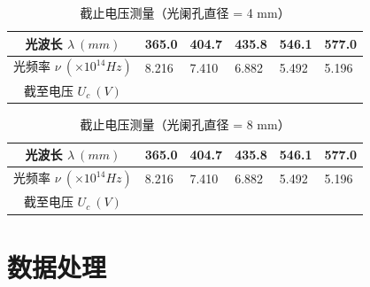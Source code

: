 \documentclass{ctexart}
\begin{document}
\begin{table}[!h]
    \centering
    \renewcommand{\arraystretch}{1.5} %
    \caption{截止电压测量（光阑孔直径 = 4 mm）}
    \begin{tabular}{|c|m{1.5cm}<{\centering}|m{1.5cm}<{\centering}|m{1.5cm}<{\centering}|m{1.5cm}<{\centering}|m{1.5cm}<{\centering}|}
        \hline
        光波长 $\lambda \ (mm)$ & 365.0 & 404.7 & 435.8 & 546.1 & 577.0 \\
        \hline
        光频率 $\nu \ (\times 10^{14} Hz)$ & 8.216 & 7.410 & 6.882 & 5.492 & 5.196 \\
        \hline
        截至电压 $ U_c \ (V)$ & & & & & \\
        \hline
    \end{tabular}
\end{table}

\begin{table}[!h]
    \centering
    \renewcommand{\arraystretch}{1.5} %
    \caption{截止电压测量（光阑孔直径 = 8 mm）}
    \begin{tabular}{|c|m{1.5cm}<{\centering}|m{1.5cm}<{\centering}|m{1.5cm}<{\centering}|m{1.5cm}<{\centering}|m{1.5cm}<{\centering}|}
        \hline
        光波长 $\lambda \ (mm)$ & 365.0 & 404.7 & 435.8 & 546.1 & 577.0 \\
        \hline
        光频率 $\nu \ (\times 10^{14} Hz)$ & 8.216 & 7.410 & 6.882 & 5.492 & 5.196 \\
        \hline
        截至电压 $ U_c \ (V)$ & & & & & \\
        \hline
    \end{tabular}
\end{table}


\newpage

\section{数据处理}
\end{document}
